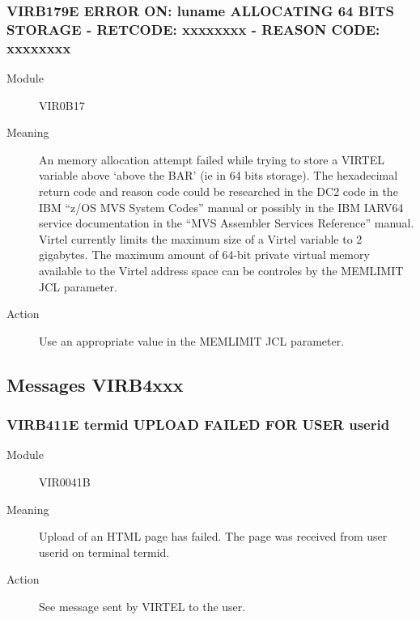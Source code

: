 \documentclass[letterpaper,10pt,english]{sphinxmanual}
\begin{document}
\subsubsection{VIRB179E ERROR ON: luname ALLOCATING 64 BITS STORAGE - RETCODE: xxxxxxxx - REASON CODE: xxxxxxxx}
\label{\detokenize{messages:virb179e-error-on-luname-allocating-64-bits-storage-retcode-xxxxxxxx-reason-code-xxxxxxxx}}\begin{description}
\item[{Module}] \leavevmode
VIR0B17

\item[{Meaning}] \leavevmode
An memory allocation attempt failed while trying to store a VIRTEL variable above ‘above the BAR’ (ie in 64 bits storage). The hexadecimal return code and reason code could be researched in the DC2 code in the IBM “z/OS   MVS System Codes” manual or possibly in the IBM IARV64 service documentation in the “MVS Assembler Services Reference” manual. Virtel currently limits the maximum size of a Virtel variable to 2 gigabytes. The maximum amount of 64-bit private virtual memory available to the Virtel address space can be controles by the MEMLIMIT JCL parameter.

\item[{Action}] \leavevmode
Use an appropriate value in the MEMLIMIT JCL parameter.

\end{description}


\subsection{Messages VIRB4xxx}
\label{\detokenize{messages:messages-virb4xxx}}

\subsubsection{VIRB411E termid UPLOAD FAILED FOR USER userid}
\label{\detokenize{messages:virb411e-termid-upload-failed-for-user-userid}}\begin{description}
\item[{Module}] \leavevmode
VIR0041B

\item[{Meaning}] \leavevmode
Upload of an HTML page has failed. The page was received from user userid on terminal termid.

\item[{Action}] \leavevmode
See message sent by VIRTEL to the user.

\end{description}
\end{document}
